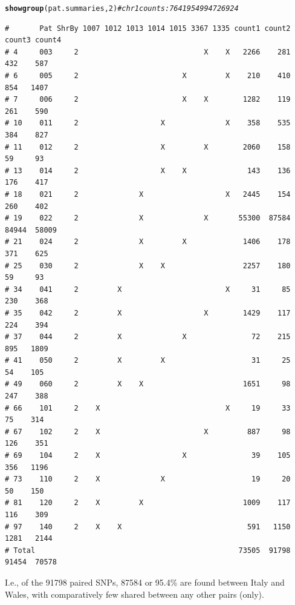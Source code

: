 \documentclass{article}\usepackage[]{graphicx}\usepackage[]{color}
\makeatletter
\newcommand{\hlnum}[1]{\textcolor[rgb]{0.686,0.059,0.569}{#1}}%
\newcommand{\hlcom}[1]{\textcolor[rgb]{0.678,0.584,0.686}{\textit{#1}}}%
\newcommand{\hlstd}[1]{\textcolor[rgb]{0.345,0.345,0.345}{#1}}%
\newcommand{\hlkwd}[1]{\textcolor[rgb]{0.737,0.353,0.396}{\textbf{#1}}}%
\newenvironment{kframe}{%
 \def\at@end@of@kframe{}%
 \ifinner\ifhmode%
  \def\at@end@of@kframe{\end{minipage}}%
  \begin{minipage}{\columnwidth}%
 \fi\fi%
 \def\FrameCommand##1{\hskip\@totalleftmargin \hskip-\fboxsep
 \colorbox{shadecolor}{##1}\hskip-\fboxsep
     \hskip-\linewidth \hskip-\@totalleftmargin \hskip\columnwidth}%
 \MakeFramed {\advance\hsize-\width
   \@totalleftmargin\z@ \linewidth\hsize
   \@setminipage}}%
 {\par\unskip\endMakeFramed%
 \at@end@of@kframe}
\newenvironment{knitrout}{}{} %
\makeatother
\begin{document}
\begin{knitrout}\footnotesize
{}\color{fgcolor}\begin{kframe}
\begin{alltt}
\hlkwd{showgroup}\hlstd{(pat.summaries,}\hlnum{2}\hlstd{)} \hlcom{# chr 1 counts: 7641   9549   9472  6924}
\end{alltt}
\begin{verbatim}
#       Pat ShrBy 1007 1012 1013 1014 1015 3367 1335 count1 count2 count3 count4
# 4     003     2                             X    X   2266    281    432    587
# 6     005     2                        X         X    210    410    854   1407
# 7     006     2                        X    X        1282    119    261    590
# 10    011     2                   X              X    358    535    384    827
# 11    012     2                   X         X        2060    158     59     93
# 13    014     2                   X    X              143    136    176    417
# 18    021     2              X                   X   2445    154    260    402
# 19    022     2              X              X       55300  87584  84944  58009
# 21    024     2              X         X             1406    178    371    625
# 25    030     2              X    X                  2257    180     59     93
# 34    041     2         X                        X     31     85    230    368
# 35    042     2         X                   X        1429    117    224    394
# 37    044     2         X              X               72    215    895   1809
# 41    050     2         X         X                    31     25     54    105
# 49    060     2         X    X                       1651     98    247    388
# 66    101     2    X                             X     19     33     75    314
# 67    102     2    X                        X         887     98    126    351
# 69    104     2    X                   X               39    105    356   1196
# 73    110     2    X              X                    19     20     50    150
# 81    120     2    X         X                       1009    117    116    309
# 97    140     2    X    X                             591   1150   1281   2144
# Total                                               73505  91798  91454  70578
\end{verbatim}
\end{kframe}
\end{knitrout}

I.e., of the 91798 paired SNPs, 87584 or
95.4\% are found between Italy
and Wales, with comparatively few shared between any other pairs (only).
\end{document}

